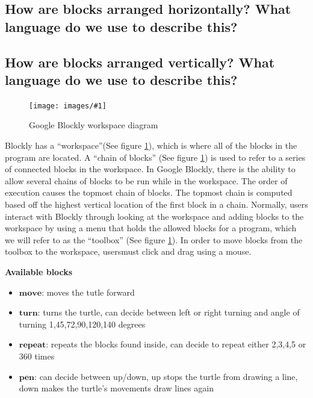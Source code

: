 \documentclass[]{article}
\newcommand\fig[3]{
\begin{figure}
  \begin{center}
  \texttt{[image: images/\#1]}
  \caption{#2} 
  \label{fig:#1}
  \end{center}
\end{figure}
}
\begin{document}
\subsection{How are blocks arranged horizontally? What language do we use to describe this?}

\subsection{How are blocks arranged vertically? What language do we use to describe this?}

\fig{workspaceDiagram.jpg}{Google Blockly workspace diagram}{width=7cm}

Blockly has a ``workspace''(See figure \ref{fig:workspaceDiagram.jpg}), which is where all of the blocks in the program are located. A ``chain of blocks''
(See figure \ref{fig:workspaceDiagram.jpg}) is used to refer to a series of connected blocks in the workspace. In Google Blockly,  
there is the ability to allow several chains of blocks to be run while
in the workspace. The order of execution causes the topmost chain of blocks. The topmost chain
is computed based off the highest vertical location of the first block in a chain. Normally, users interact
with Blockly through looking at the workspace and adding blocks to the workspace by
using a menu that holds the allowed blocks for a program, which we will refer to as the 
``toolbox'' (See figure \ref{fig:workspaceDiagram.jpg}). In order to move blocks from the toolbox to the 
workspace, usersmust click and drag using a mouse. 


\textbf{Available blocks}
\begin{itemize}
\item $\textbf{move}$: moves the tutle forward
\item $\textbf{turn}$: turns the turtle, can decide between left or right turning and angle of turning  1,45,72,90,120,140 degrees
\item $\textbf{repeat}$: repeats the blocks found inside, can decide to repeat either 2,3,4,5 or 360 times
\item $\textbf{pen}$: can decide between up/down, up stops the turtle from drawing a line, down makes the turtle's movements draw lines again
\end{itemize}

\end{document}
